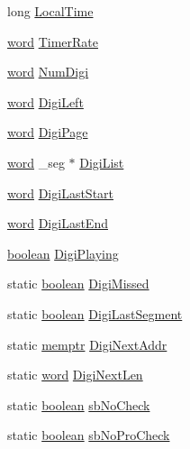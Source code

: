 \begin{DoxyCompactItemize}
\item 
long \hyperlink{ID__SD_8C_a7afd2763911a393050bf2137da76c5fd}{LocalTime}
\item 
\hyperlink{ID__HEAD_8H_abad51e07ab6d26bec9f1f786c8d65bcd}{word} \hyperlink{ID__SD_8C_a23bab8f4441c3742d3c4b434ee538883}{TimerRate}
\item 
\hyperlink{ID__HEAD_8H_abad51e07ab6d26bec9f1f786c8d65bcd}{word} \hyperlink{ID__SD_8C_a916d5f5305d88f51d724828315b59186}{NumDigi}
\item 
\hyperlink{ID__HEAD_8H_abad51e07ab6d26bec9f1f786c8d65bcd}{word} \hyperlink{ID__SD_8C_a89fbd187963ac377958d6b237f1fcc46}{DigiLeft}
\item 
\hyperlink{ID__HEAD_8H_abad51e07ab6d26bec9f1f786c8d65bcd}{word} \hyperlink{ID__SD_8C_af8e675cf1832477b600b538ac47b7e54}{DigiPage}
\item 
\hyperlink{ID__HEAD_8H_abad51e07ab6d26bec9f1f786c8d65bcd}{word} \_\-seg $\ast$ \hyperlink{ID__SD_8C_a2b26601a3e4cc93dd3d9334e80b021e9}{DigiList}
\item 
\hyperlink{ID__HEAD_8H_abad51e07ab6d26bec9f1f786c8d65bcd}{word} \hyperlink{ID__SD_8C_a5884c076780a9146beaad7f88bb8281b}{DigiLastStart}
\item 
\hyperlink{ID__HEAD_8H_abad51e07ab6d26bec9f1f786c8d65bcd}{word} \hyperlink{ID__SD_8C_a8e9a757998c8a7fabc44ef7bb4df0c5e}{DigiLastEnd}
\item 
\hyperlink{ID__HEAD_8H_a7c6368b321bd9acd0149b030bb8275ed}{boolean} \hyperlink{ID__SD_8C_a11b9e79724767ea7fe4429444baa39c0}{DigiPlaying}
\item 
static \hyperlink{ID__HEAD_8H_a7c6368b321bd9acd0149b030bb8275ed}{boolean} \hyperlink{ID__SD_8C_a27f3c90423cbb815ee1b0e770a19405f}{DigiMissed}
\item 
static \hyperlink{ID__HEAD_8H_a7c6368b321bd9acd0149b030bb8275ed}{boolean} \hyperlink{ID__SD_8C_a175fff911b205d6eab165b4d663d18ae}{DigiLastSegment}
\item 
static \hyperlink{ID__MM_8H_a04062decc7eb282b066c65e9137bb9bf}{memptr} \hyperlink{ID__SD_8C_a846fbdd67326e91ee34af59e8268175a}{DigiNextAddr}
\item 
static \hyperlink{ID__HEAD_8H_abad51e07ab6d26bec9f1f786c8d65bcd}{word} \hyperlink{ID__SD_8C_ac02097e52e282e33c996fe63302ff330}{DigiNextLen}
\item 
static \hyperlink{ID__HEAD_8H_a7c6368b321bd9acd0149b030bb8275ed}{boolean} \hyperlink{ID__SD_8C_a770a1bd139fc8c8c3eabbaee656f7628}{sbNoCheck}
\item 
static \hyperlink{ID__HEAD_8H_a7c6368b321bd9acd0149b030bb8275ed}{boolean} \hyperlink{ID__SD_8C_aad363947cccbc8a4572d133d099d9ab7}{sbNoProCheck}

\end{DoxyCompactItemize}
